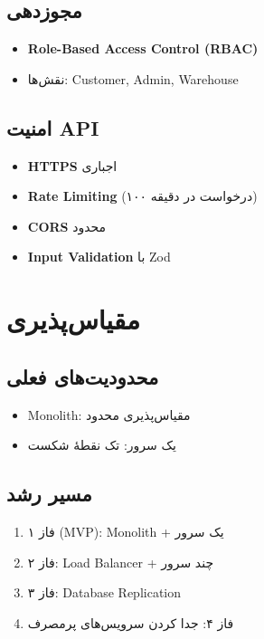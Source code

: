 \documentclass[12pt, a4paper]{article}
\begin{document}
\subsection{مجوزدهی}
\begin{itemize}
    \item \textbf{Role-Based Access Control (RBAC)}
    \item نقش‌ها: Customer, Admin, Warehouse
\end{itemize}

\subsection{امنیت API}
\begin{itemize}
    \item \textbf{HTTPS} اجباری
    \item \textbf{Rate Limiting} (۱۰۰ درخواست در دقیقه)
    \item \textbf{CORS} محدود
    \item \textbf{Input Validation} با Zod
\end{itemize}

\section{مقیاس‌پذیری}

\subsection{محدودیت‌های فعلی}
\begin{itemize}
    \item Monolith: مقیاس‌پذیری محدود
    \item یک سرور: تک نقطهٔ شکست
\end{itemize}

\subsection{مسیر رشد}
\begin{enumerate}
    \item فاز ۱ (MVP): Monolith + یک سرور
    \item فاز ۲: Load Balancer + چند سرور
    \item فاز ۳: Database Replication
    \item فاز ۴: جدا کردن سرویس‌های پرمصرف
\end{enumerate}
\end{document}
